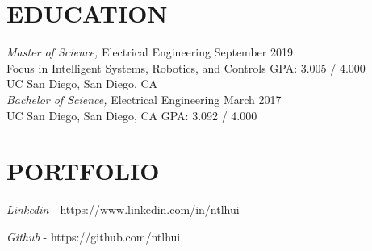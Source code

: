 \documentclass[line,margin]{res}
\begin{document}
\begin{resume}
\section{EDUCATION}
	{\sl Master of Science,} Electrical Engineering \hfill September 2019\\
	Focus in Intelligent Systems, Robotics, and Controls \hfill GPA: 3.005 / 4.000\\
	UC San Diego, San Diego, CA\\

	{\sl Bachelor of Science,} Electrical Engineering  \hfill March 2017\\
    UC San Diego, San Diego, CA \hfill GPA: 3.092 / 4.000\\

\section{PORTFOLIO}
	{\sl Linkedin} - https://www.linkedin.com/in/ntlhui

	{\sl Github} - https://github.com/ntlhui

\end{resume}
\end{document}
